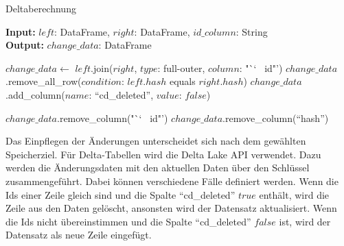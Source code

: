 \begin{algorithm}
    \caption{Deltaberechnung}
    \label{algo:delta-calc}
    \textbf{Input:} $left$: DataFrame, $right$: DataFrame, $id\_column$: String  \\
    \textbf{Output:} $change\_data$: DataFrame \\
    

    $change\_data \gets$ $left$.join($right$, $type$: full-outer, $column$: "`\char`~ id"')\;
    $change\_data$.remove\_all\_row($condition$: $left.hash$ equals $right.hash$)\;
    $change\_data$.add\_column($name$: "`cd\_deleted"', $value$: $false$)\;

    
    $change\_data$.remove\_column("`\char`~ id"')\;
    $change\_data$.remove\_column("`hash"')\;

\end{algorithm}

Das Einpflegen der Änderungen unterscheidet sich nach dem gewählten Speicherziel.
Für Delta-Tabellen wird die Delta Lake API verwendet.
Dazu werden die Änderungsdaten mit den aktuellen Daten über den Schlüssel zusammengeführt.
Dabei können verschiedene Fälle definiert werden.
Wenn die Ids einer Zeile gleich sind und die Spalte "`cd\_deleted"' $true$ enthält, wird die Zeile aus den Daten gelöscht, ansonsten wird der Datensatz aktualisiert.
Wenn die Ids nicht übereinstimmen und die Spalte "`cd\_deleted"' $false$ ist, wird der Datensatz als neue Zeile eingefügt.

